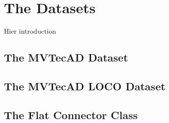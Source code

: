 \chapter{The Datasets}
\label{chap:datasets}

Hier introduction


\section{The MVTecAD Dataset}
\label{sec:mvtecaddataset}




\section{The MVTecAD LOCO Dataset}
\label{sec:mvtecadlocodataset}




\section{The Flat Connector Class}
\label{sec:flatconnectordescription}







